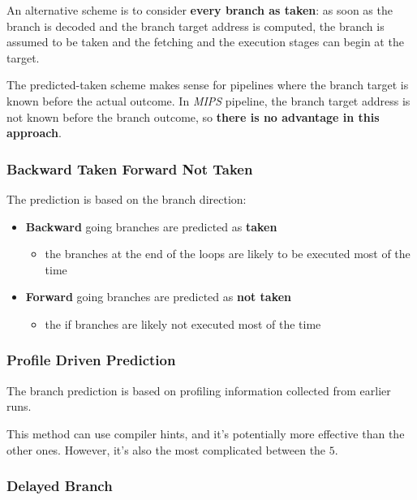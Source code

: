 \documentclass[english]{article}
\begin{document}
An alternative scheme is to consider \textbf{every branch as taken}: as soon as the branch is decoded and the branch target address is computed, the branch is assumed to be taken and the fetching and the execution stages can begin at the target.

The predicted-taken scheme makes sense for pipelines where the branch target is known before the actual outcome.
In \textit{MIPS} pipeline, the branch target address is not known before the branch outcome, so \textbf{there is no advantage in this approach}.

\subsubsection{Backward Taken Forward Not Taken}
\label{sec:backward-taken-forward-not-taken}

The prediction is based on the branch direction:

\begin{itemize}
  \item \textbf{Backward} going branches are predicted as \textbf{taken}
        \begin{itemize}
          \item the branches at the end of the loops are likely to be executed most of the time
        \end{itemize}
  \item \textbf{Forward} going branches are predicted as \textbf{not taken}
        \begin{itemize}
          \item the if branches are likely not executed most of the time
        \end{itemize}
\end{itemize}

\subsubsection{Profile Driven Prediction}
\label{sec:profile-driven-prediction}

The branch prediction is based on profiling information collected from earlier runs.

This method can use compiler hints, and it's potentially more effective than the other ones.
However, it's also the most complicated between the  \(5\).

\subsubsection{Delayed Branch}
\label{sec:delayed-branch}
\end{document}
